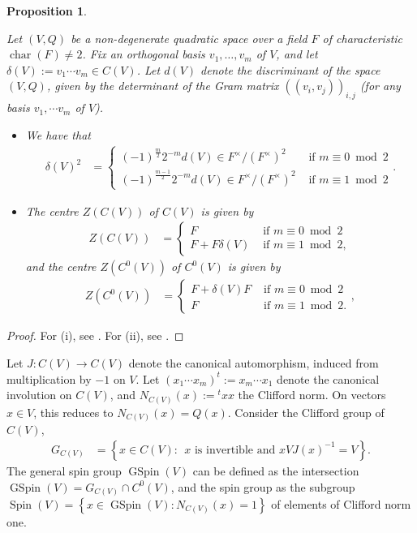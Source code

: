 \documentclass{amsart}
\newtheorem{proposition}[theorem]{Proposition}
\theoremstyle{definition}
\theoremstyle{definition}
\theoremstyle{definition}
\begin{document}
\begin{proposition}\label{Clifford} 

Let $(V, Q)$ be a non-degenerate quadratic space over a field $F$ of characteristic $\operatorname{char}(F) \neq 2$.
Fix an orthogonal basis $v_1, \ldots, v_m$ of $V$, and let $\delta(V) := v_1 \cdots v_m \in C(V)$. Let $d(V)$ denote the discriminant of the
space $(V,Q)$, given by the determinant of the Gram matrix $((v_i, v_j))_{i, j}$ (for any basis $v_1, \cdots v_m$ of $V$).

\begin{itemize}

\item[(i)] We have that
\begin{align*} \delta(V)^2 &= \begin{cases} (-1)^{\frac{m}{2}} 2^{-m} d(V) \in F^{\times}/(F^{\times})^2 &\text{ if $m \equiv 0 \bmod 2$} \\
(-1)^{\frac{m-1}{2}} 2^{-m} d(V) \in F^{\times}/(F^{\times})^2 &\text{ if $m \equiv 1 \bmod 2$} \end{cases}. \end{align*}

\item[(ii)] The centre $Z(C(V))$ of $C(V)$ is given by 
\begin{align*} Z(C(V)) &= \begin{cases} F &\text{ if $m \equiv 0 \bmod 2$} \\ F + F \delta(V) &\text{ if $m \equiv 1 \bmod 2$}, \end{cases} \end{align*}
and the centre $Z(C^0(V))$ of $C^0(V)$ is given by 
\begin{align*} Z(C^0(V)) &= \begin{cases} F + \delta(V) F &\text{ if $m \equiv 0 \bmod 2$} \\ F &\text{ if $m \equiv 1 \bmod 2$}. \end{cases}, \end{align*}

\end{itemize} \end{proposition}

\begin{proof} For (i), see \cite[Remark 2.5]{Br-123}. For (ii), see \cite[Theorem 2.6]{Br-123}. \end{proof}

Let $J:C(V)\rightarrow C(V)$ denote the canonical automorphism, induced from multiplication by $-1$ on $V$.
Let $(x_1 \cdots  x_m)^t := x_m  \cdots  x_1$ denote the canonical involution on $C(V)$, and $N_{C(V)}(x) := {}^t x x$ the Clifford norm. 
On vectors $x \in V$, this reduces to $N_{C(V)}(x) = Q(x)$. Consider the Clifford group of $C(V)$, 
\begin{align*} G_{C(V)} &= \left\lbrace x \in C(V): ~~\text{$x$ is invertible and $x V J(x)^{-1} = V$} \right\rbrace. \end{align*}
The general spin group $\operatorname{GSpin}(V)$ can be defined as the intersection $\operatorname{GSpin}(V) = G_{C(V)} \cap C^0(V)$,
and the spin group as the subgroup $\operatorname{Spin}(V) = \left\lbrace  x \in \operatorname{GSpin}(V): N_{C(V)}(x) =1 \right\rbrace$ of elements of Clifford norm one. 
\end{document}
